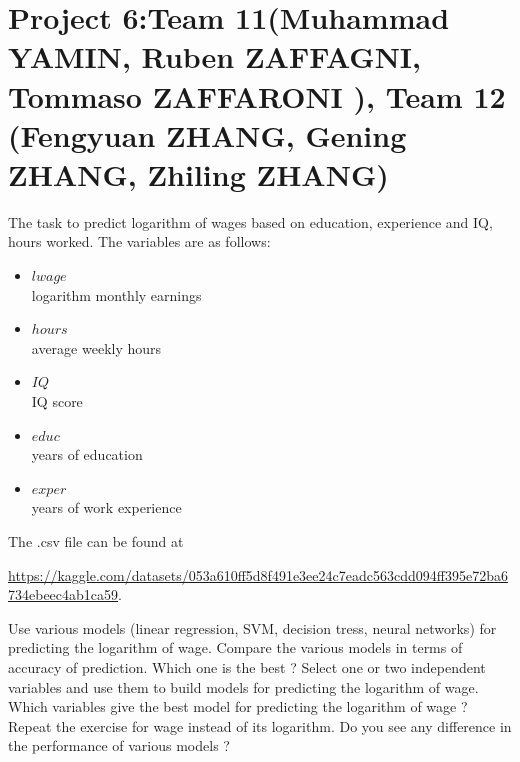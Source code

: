 \documentclass{article}
\begin{document}
\section*{Project 6:Team 11(Muhammad YAMIN, Ruben ZAFFAGNI, Tommaso ZAFFARONI
), Team 12 (Fengyuan ZHANG, Gening ZHANG, Zhiling ZHANG) }
   The task to predict logarithm of wages based on education, experience and IQ, hours worked. The variables are as follows:
   \begin{itemize}
   \item{$lwage$ \\}                    logarithm monthly earnings
   \item{$hours$ \\}                    average weekly hours
   \item{$IQ$ \\}                      IQ score
   \item{$educ$ \\}                     years of education
   \item{$exper$ \\}                    years of work experience
   \end{itemize}

   The .csv file can be found at  

   \url{https://kaggle.com/datasets/053a610ff5d8f491e3ee24c7eadc563cdd094ff395e72ba6734ebeec4ab1ca59}.
  
  Use various models (linear regression, SVM, decision tress, neural networks) for predicting the logarithm of wage. Compare the various models in terms of accuracy of prediction. Which one is the best ? 
   Select one or two independent variables  and use them to build models for predicting the logarithm of wage.
  Which variables give the best model for predicting  the logarithm of wage  ? Repeat the exercise for wage instead of its logarithm. Do you see any difference in the performance of various models ? 
   
\end{document}
